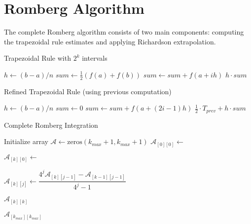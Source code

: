\section{Romberg Algorithm}
The complete Romberg algorithm consists of two main components: computing the trapezoidal rule estimates and applying Richardson extrapolation.

\begin{algorithm}[H]
  \caption{Trapezoidal Rule with $2^k$ intervals}
  \label{alg:trapezoid}
  \begin{algorithmic}[1]
      \State $h \gets (b-a)/n$
      \State $sum \gets \frac{1}{2}(f(a) + f(b))$
        \State $sum \gets sum + f(a + ih)$
      \EndFor
      \State \Return $h \cdot sum$
    \EndFunction
  \end{algorithmic}
\end{algorithm}

\begin{algorithm}[H]
  \caption{Refined Trapezoidal Rule (using previous computation)}
  \label{alg:refined-trapezoid}
  \begin{algorithmic}[1]
      \State $h \gets (b-a)/n$
      \State $sum \gets 0$
        \State $sum \gets sum + f(a + (2i-1)h)$
      \EndFor
      \State \Return $\frac{1}{2} \cdot T_{prev} + h \cdot sum$
    \EndFunction
  \end{algorithmic}
\end{algorithm}

\begin{algorithm}[H]
  \caption{Complete Romberg Integration}
  \label{alg:complete-romberg}
  \begin{algorithmic}[1]
      \State Initialize array $\mathcal{A} \gets \text{zeros}(k_{max}+1, k_{max}+1)$
      \State $\mathcal{A}_{[0][0]} \gets$ 

        \State $\mathcal{A}_{[k][0]} \gets$ 

          \State $\mathcal{A}_{[k][j]} \gets \dfrac{4^j \mathcal{A}_{[k][j-1]} - \mathcal{A}_{[k-1][j-1]}}{4^j - 1}$
        \EndFor

          \State \Return $\mathcal{A}_{[k][k]}$
        \EndIf
      \EndFor

      \State \Return $\mathcal{A}_{[k_{max}][k_{max}]}$
    \EndFunction
  \end{algorithmic}
\end{algorithm}

